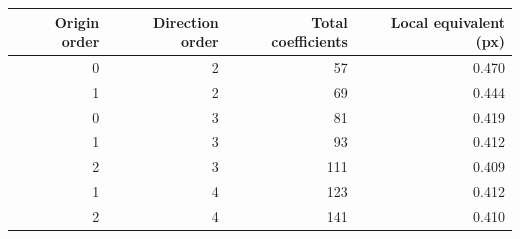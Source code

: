 \begin{tabular}{rrrr}\toprule
Origin order & Direction order & Total coefficients & Local equivalent (px)\\\midrule
0 & 2 & 57 & 0.470 \\
1 & 2 & 69 & 0.444 \\
0 & 3 & 81 & 0.419 \\
1 & 3 & 93 & 0.412 \\
2 & 3 & 111 & 0.409 \\
1 & 4 & 123 & 0.412 \\
2 & 4 & 141 & 0.410 \\
\bottomrule
\end{tabular}
